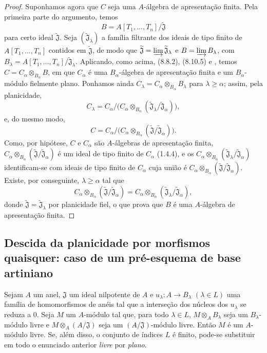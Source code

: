 \begin{proof}
Suponhamos agora que $C$ seja
uma $A$-álgebra de apresentação
finita. Pela primeira parte do
argumento, temos
\[
B=A[T_1,\ldots,T_n]/
\widetilde{\mathfrak J}
\]
para certo ideal
$\widetilde{\mathfrak J}$.
Seja $(\widetilde{\mathfrak J}_\lambda)$
a família filtrante dos ideais
de tipo finito de
$A[T_1,\ldots,T_n]$ contidos em
$\widetilde{\mathfrak J}$, de
modo que
$\widetilde{\mathfrak J}
=\varinjlim\widetilde{\mathfrak J}_\lambda$
e $B=\varinjlim B_\lambda$, com
$B_\lambda=A[T_1,\ldots,T_n]/
\widetilde{\mathfrak J}_\lambda$.
Aplicando, como acima, (8.8.2),
(8.10.5) e ,
temos $C=C_\alpha\otimes_{B_\alpha}B$,
em que $C_\alpha$ é uma
$B_\alpha$-álgebra de apresentação
finita e um $B_\alpha$-módulo
fielmente plano. Ponhamos ainda
$C_\lambda=C_\alpha\otimes_{B_\alpha}
B_\lambda$ para
$\lambda\geq\alpha$; assim,
pela planicidade,
\[
C_\lambda=C_\alpha\Big/
\Big(C_\alpha\otimes_{B_\alpha}
(\widetilde{\mathfrak J}_\lambda/
\widetilde{\mathfrak J}_\alpha)\Big),
\]
e, do mesmo modo,
\[
C=C_\alpha\Big/
\Big(C_\alpha\otimes_{B_\alpha}
(\widetilde{\mathfrak J}/
\widetilde{\mathfrak J}_\alpha)\Big).
\]
Como, por hipótese, $C$ e
$C_\alpha$ são $A$-álgebras
de apresentação finita,
$C_\alpha\otimes_{B_\alpha}
(\widetilde{\mathfrak J}/
\widetilde{\mathfrak J}_\alpha)$
é um ideal de tipo finito de
$C_\alpha$ (1.4.4), e os
$C_\alpha\otimes_{B_\alpha}
(\widetilde{\mathfrak J}_\lambda/
\widetilde{\mathfrak J}_\alpha)$
identificam-se com ideais de
tipo finito de $C_\alpha$ cuja
união é
$C_\alpha\otimes_{B_\alpha}
(\widetilde{\mathfrak J}/
\widetilde{\mathfrak J}_\alpha)$.
Existe, por conseguinte,
$\lambda\geq\alpha$ tal que
\[
C_\alpha\otimes_{B_\alpha}
(\widetilde{\mathfrak J}/
\widetilde{\mathfrak J}_\alpha)
=C_\alpha\otimes_{B_\alpha}
(\widetilde{\mathfrak J}_\lambda/
\widetilde{\mathfrak J}_\alpha),
\]
donde
$\widetilde{\mathfrak J}
=\widetilde{\mathfrak J}_\lambda$
por planicidade fiel, o que
prova que $B$ é uma $A$-álgebra
de apresentação finita.
\end{proof}

\subsection{Descida da planicidade por
morfismos quaisquer: caso de um
pré-esquema de base artiniano}
\label{subsection:IV.11.4}

\begin{theorem}[11.4.1]
\label{IV.11.4.1}
Sejam $A$ um anel, $\mathfrak J$
um ideal nilpotente de $A$ e
$u_\lambda:A\to B_\lambda$
$(\lambda\in L)$ uma família de
homomorfismos de anéis tal que a
interseção dos núcleos dos
$u_\lambda$ se reduza a $0$.
Seja $M$ um $A$-módulo tal que,
para todo $\lambda\in L$,
$M\otimes_A B_\lambda$ seja um
$B_\lambda$-módulo livre e
$M\otimes_A(A/\mathfrak J)$ seja
um $(A/\mathfrak J)$-módulo livre.
Então $M$ é um $A$-módulo livre.
Se, além disso, o conjunto de
índices $L$ é finito, pode-se
substituir em todo o enunciado
anterior \emph{livre} por
\emph{plano}.
\end{theorem}

